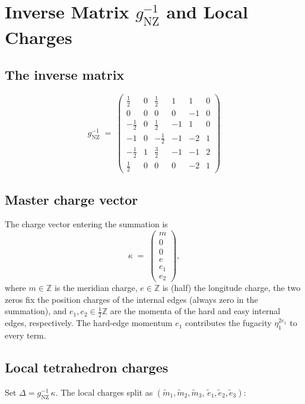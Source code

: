 \documentclass[11pt]{article}
\newcommand{\half}{\tfrac{1}{2}}
\begin{document}
\section{Inverse Matrix $g_{\mathrm{NZ}}^{-1}$ and Local Charges}

\subsection{The inverse matrix}

\[
g_{\mathrm{NZ}}^{-1} \;=\;
\left(\begin{array}{rrrrrr}
 \half  &  0 & \half  &  1 &  1 & 0 \\
 0      &  0 &  0     &  0 & -1 & 0 \\
{-\half}&  0 & \half  & -1 &  1 & 0 \\
{-1}    &  0 &{-\half}& -1 & -2 & 1 \\
{-\half}&  1 & \frac{3}{2} & -1 & -1 & 2 \\
 \half  &  0 &  0     &  0 & -2 & 1
\end{array}\right)
\]

\subsection{Master charge vector}

The charge vector entering the summation is
\[
\kappa \;=\;
\begin{pmatrix}
 m \\ 0 \\ 0 \\ e \\ e_1 \\ e_2
\end{pmatrix},
\]
where $m \in \mathbb{Z}$ is the meridian charge, $e \in \mathbb{Z}$ is (half) the
longitude charge, the two zeros fix the position charges of the internal edges
(always zero in the summation), and
$e_1, e_2 \in \tfrac{1}{2}\mathbb{Z}$ are the momenta of the hard and easy
internal edges, respectively. The hard-edge momentum $e_1$ contributes the
fugacity $\eta_1^{2e_1}$ to every term.

\subsection{Local tetrahedron charges}

Set $\Delta = g_{\mathrm{NZ}}^{-1}\,\kappa$.
The local charges split as $(\widetilde{m}_1, \widetilde{m}_2, \widetilde{m}_3,\, \widetilde{e}_1, \widetilde{e}_2, \widetilde{e}_3)$:
\end{document}
